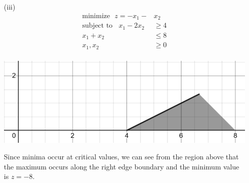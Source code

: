 \documentclass{article}
\begin{document}
\begin{itemize}
    \item[(iii)]
    \begin{align*}
        \text{minimize} \:\:\: z = -x_1 - &x_2 \\
        \text{subject to} \:\:\:\: x_1 - 2x_2 &\geq 4 \\
        x_1 + x_2 &\leq 8\\
        x_1,x_2 &\geq 0\\
    \end{align*}
    \begin{center}
        \includegraphics[scale = 0.8]{region2}
    \end{center}
    Since minima occur at critical values, we can see from the region above that the maximum occurs along the right edge boundary and the minimum value is $z = -8$.
\end{itemize}
\end{document}
